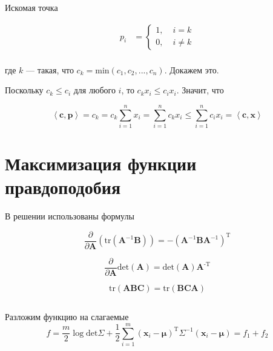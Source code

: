 	Искомая точка
	
	\begin{align}
	p_i &=
	\left\{
	\begin{aligned}
	1 ,\; & i = k\\
	0 ,\; & i \neq k
	\end{aligned}
	\right. \\
	\end{align}
	
	где $k$ --- такая, что $c_k = \text{min}(c_1, c_2,...,c_n)$. Докажем это.
	
	Поскольку $c_k \leqslant c_i$ для любого $i$, то $c_k x_i \leqslant c_i x_i$. Значит, что
	
	\begin{equation}
	\left\langle \mathbf{c},\mathbf{p} \right\rangle  = c_k = c_k \sum\limits_{i=1}^{n}  x_i =  \sum\limits_{i=1}^{n} c_k x_i \leqslant \sum\limits_{i=1}^{n} c_i x_i = \left\langle \mathbf{c},\mathbf{x} \right\rangle
	\end{equation}
	
	
	\section{Максимизация функции правдоподобия}
	
	В решении использованы формулы
	
	\begin{equation}
	\label{prove32}
	\frac{\partial}{\partial \mathbf{A}}(\text{tr}(\mathbf{A}^{-1}\mathbf{B})) = -(\mathbf{A}^{-1}\mathbf{B}\mathbf{A}^{-1})^{\text{T}}
	\end{equation}
	
	\begin{equation}
	\label{det31}
	\frac{\partial }{\partial \mathbf{A}} \text{det} (\mathbf{A})= \text{det} (\mathbf{A}) \mathbf{A}^\text{-T}
	\end{equation}
	
	\begin{equation}
	\label{abc}
	\text{tr}(\mathbf{A}\mathbf{B}\mathbf{C}) = \text{tr}(\mathbf{B}\mathbf{C}\mathbf{A})
	\end{equation}
	
	
	
	\subsection{}
	Разложим функцию на слагаемые
	\begin{equation}
	f = \frac{m}{2} \log \text{det} \Sigma + \frac 12 \sum\limits_{i=1}^{m} (\mathbf{x}_i -\boldsymbol{\mu} )^\text{T} \Sigma^{-1} (\mathbf{x}_i -\boldsymbol{\mu} ) = f_1 + f_2
	\end{equation}
	
